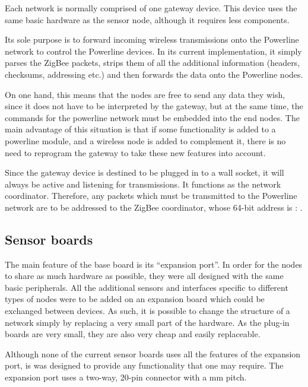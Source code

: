 Each network is normally comprised of one gateway device. This device uses the
same basic hardware as the sensor node, although it requires less components.


Its sole purpose is to forward incoming wireless transmissions onto the
Powerline network to control the Powerline devices. In its current
implementation, it simply parses the ZigBee packets, strips them of all the
additional information (headers, checksums, addressing etc.) and then forwards
the data onto the Powerline nodes.

On one hand, this means that the nodes are free to send any data they wish,
since it does not have to be interpreted by the gateway, but at the same time,
the commands for the powerline network must be embedded into the end nodes. The
main advantage of this situation is that if some functionality is added to a
powerline module, and a wireless node is added to complement it, there is no
need to reprogram the gateway to take these new features into account.

Since the gateway device is destined to be plugged in to a wall socket, it will
always be active and listening for transmissions. It functions as the network
coordinator. Therefore, any packets which must be transmitted to the Powerline
network are to be addressed to the ZigBee coordinator, whose 64-bit address is :
.

\subsection{Sensor boards}

The main feature of the base board is its ``expansion port''. In order for the
nodes to share as much hardware as possible, they were all designed with the
same basic peripherals. All the additional sensors and interfaces specific to
different types of nodes were to be added on an expansion board which could be
exchanged between devices. As such, it is possible to change the structure of a
network simply by replacing a very small part of the hardware. As the plug-in
boards are very small, they are also very cheap and easily replaceable.

Although none of the current sensor boards uses all the features of the
expansion port, is was designed to provide any functionality that one may
require. The expansion port uses a two-way, 20-pin connector with a \unit[2]{mm}
pitch.

